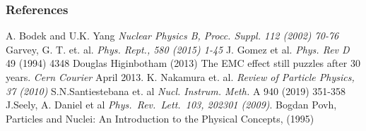\documentclass[12pt]{beamer}
\begin{document}
\begin{frame}[allowframebreaks]
\vspace*{-3pt}
\frametitle{References}
\footnotesize{
	\begin{thebibliography}{9} %
		\vspace*{-20pt}
		 A. Bodek and U.K. Yang
		\newblock \emph{Nuclear Physics B, Procc. Suppl. 112 (2002) 70-76 }			
\vspace*{-8pt}
		 Garvey, G. T. et. al.
		\newblock \emph{Phys. Rept., 580 (2015) 1-45 }	
\vspace*{-8pt}		
		 J. Gomez et al.   
		\newblock \emph{Phys. Rev D}  49 (1994) 4348 
\vspace*{-8pt}
		 Douglas Higinbotham (2013) 
		\newblock The EMC effect still puzzles after 30 years. \emph{Cern Courier} April 2013.
\vspace*{-8pt}		
		 K. Nakamura et. al.
		\newblock \emph{Review of Particle Physics, 37 (2010) }	
\vspace*{-8pt}		
		 S.N.Santiestebana et. al 
		\newblock 	\emph{Nucl. Instrum. Meth.} A 940 (2019) 351-358
\vspace*{-8pt}				
		 J.Seely, A. Daniel et al  
		\newblock \emph{Phys.\ Rev.\ Lett.\   103, 202301 (2009)}.
\vspace*{-8pt}				
		 Bogdan Povh,
		\newblock Particles and Nuclei: An Introduction to the Physical Concepts, (1995)
	
		
	\end{thebibliography}
}
\end{frame}
\end{document}
